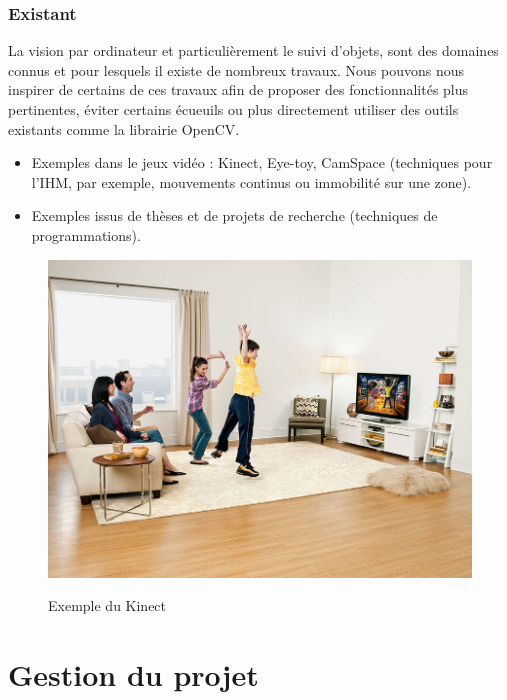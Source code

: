 \documentclass{report}
\begin{document}
		\subsubsection{Existant}
		La vision par ordinateur et particulièrement le suivi d'objets, sont des domaines connus et pour lesquels il existe de nombreux travaux. Nous pouvons nous inspirer de certains de ces travaux afin de proposer des fonctionnalités plus pertinentes, éviter certains écueuils ou plus directement utiliser des outils existants comme la librairie OpenCV.\\
			\begin{itemize}
				\item Exemples dans le jeux vidéo : Kinect, Eye-toy, CamSpace (techniques pour l'IHM, par exemple, mouvements continus ou immobilité sur une zone).
				\item Exemples issus de thèses et de projets de recherche (techniques de programmations).
			\end{itemize}
			\begin{figure}[!h]
				\centering
				\includegraphics[scale=0.2]{kinect_screen_lg.jpg}\\
				\caption{Exemple du Kinect}
				\label{Exemple du Kinect}
			\end{figure}
		\section{Gestion du projet}
\end{document}
